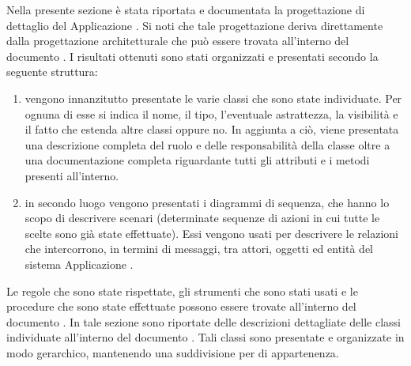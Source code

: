     Nella presente sezione è stata riportata e documentata la progettazione di dettaglio del  Applicazione . Si noti che tale progettazione deriva direttamente dalla progettazione architetturale che può essere trovata all'interno del documento . I risultati ottenuti sono stati organizzati e presentati secondo la seguente struttura:
    \begin{enumerate}
        \item vengono innanzitutto presentate le varie classi che sono state individuate. Per ognuna di esse si indica il nome, il tipo, l'eventuale astrattezza, la visibilità e il fatto che estenda altre classi oppure no. In aggiunta a ciò, viene presentata una descrizione completa del ruolo e delle responsabilità della classe oltre a una documentazione completa riguardante tutti gli attributi e i metodi presenti all'interno.
        \item in secondo luogo vengono presentati i diagrammi di sequenza, che hanno lo scopo di descrivere scenari (determinate sequenze di azioni in cui tutte le scelte sono già state effettuate). Essi vengono usati per descrivere le relazioni che intercorrono, in termini di messaggi, tra attori, oggetti ed entità del sistema Applicazione .
    \end{enumerate}
    Le regole che sono state rispettate, gli strumenti che sono stati usati e le procedure che sono state effettuate possono essere trovate all'interno del documento .
        In tale sezione sono riportate delle descrizioni dettagliate delle classi individuate all'interno del documento . Tali classi sono presentate e organizzate in modo gerarchico, mantenendo una suddivisione per  di appartenenza.
        
        

